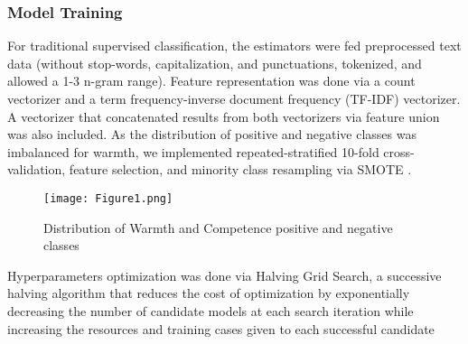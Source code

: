 \documentclass[man]{apa7}
\begin{document}
\subsubsection{Model Training}
\label{model_training}
For traditional supervised classification, the estimators were fed preprocessed text data (without stop-words, capitalization, and punctuations, tokenized, and allowed a 1-3 n-gram range). Feature representation was done via a count vectorizer and a term frequency-inverse document frequency (TF-IDF) vectorizer. A vectorizer that concatenated results from both vectorizers via feature union was also included. As the distribution of positive and negative classes was imbalanced for warmth, we implemented repeated-stratified 10-fold cross-validation, feature selection, and minority class resampling via SMOTE \parencite{aurelio_cost-sensitive_2022, chawla_smote_2002, sayyed2021StudySamplingMethods, thai-nghe_cost-sensitive_2010}.

\begin{figure}
    \caption{Distribution of Warmth and Competence positive and negative classes}
    \texttt{[image: Figure1.png]}
    \label{fig:1}
\end{figure}

Hyperparameters optimization was done via Halving Grid Search, a successive halving algorithm that reduces the cost of optimization by exponentially decreasing the number of candidate models at each search iteration while increasing the resources and training cases given to each successful candidate \parencite{}
\end{document}

